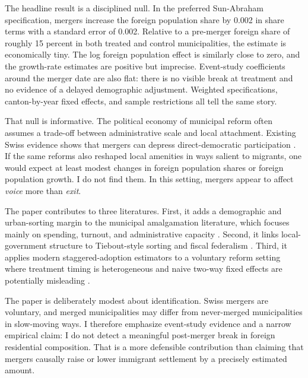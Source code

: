 \documentclass[12pt]{article}
\begin{document}
The headline result is a disciplined null. In the preferred Sun-Abraham specification, mergers increase the foreign population share by 0.002 in share terms with a standard error of 0.002. Relative to a pre-merger foreign share of roughly 15 percent in both treated and control municipalities, the estimate is economically tiny. The log foreign population effect is similarly close to zero, and the growth-rate estimates are positive but imprecise. Event-study coefficients around the merger date are also flat: there is no visible break at treatment and no evidence of a delayed demographic adjustment. Weighted specifications, canton-by-year fixed effects, and sample restrictions all tell the same story.

That null is informative. The political economy of municipal reform often assumes a trade-off between administrative scale and local attachment. Existing Swiss evidence shows that mergers can depress direct-democratic participation \citep{koch2017swiss, frey2023mergers}. If the same reforms also reshaped local amenities in ways salient to migrants, one would expect at least modest changes in foreign population shares or foreign population growth. I do not find them. In this setting, mergers appear to affect \emph{voice} more than \emph{exit}.

The paper contributes to three literatures. First, it adds a demographic and urban-sorting margin to the municipal amalgamation literature, which focuses mainly on spending, turnout, and administrative capacity \citep{allers2016effects, blomhansen2016municipal, ladner2009reforms, steiner2017assessing}. Second, it links local-government structure to Tiebout-style sorting and fiscal federalism \citep{tiebout1956pure, oates1972fiscal}. Third, it applies modern staggered-adoption estimators to a voluntary reform setting where treatment timing is heterogeneous and naive two-way fixed effects are potentially misleading \citep{callaway2021difference, sunabraham2021, goodmanbacon2021difference, rambachan2023more, roth2023synthesis}.

The paper is deliberately modest about identification. Swiss mergers are voluntary, and merged municipalities may differ from never-merged municipalities in slow-moving ways. I therefore emphasize event-study evidence and a narrow empirical claim: I do not detect a meaningful post-merger break in foreign residential composition. That is a more defensible contribution than claiming that mergers causally raise or lower immigrant settlement by a precisely estimated amount.
\end{document}
